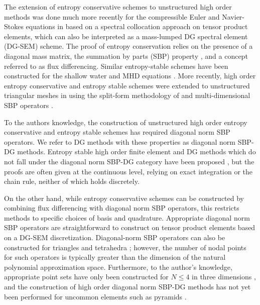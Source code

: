 \documentclass[preprint,10pt]{elsarticle}
\theoremstyle{definition}
\theoremstyle{lemma}
\theoremstyle{theorem}
\theoremstyle{assumption}
\begin{document}
The extension of entropy conservative schemes to unstructured high order methods was done much more recently for the compressible Euler and Navier-Stokes equations in \cite{fisher2013high, carpenter2014entropy} based on a spectral collocation approach on tensor product elements, which can also be interpreted as a mass-lumped DG spectral element (DG-SEM) scheme.  The proof of entropy conservation relies on the presence of a diagonal mass matrix, the summation by parts (SBP) property \cite{gassner2013skew}, and  a concept referred to as flux differencing.  Similar entropy-stable schemes have been constructed for the shallow water and MHD equations \cite{gassner2016well,  wintermeyer2017entropy, winters2017uniquely}.  More recently, high order entropy conservative and entropy stable schemes were extended to unstructured triangular meshes in \cite{chen2017entropy} using the split-form methodology of \cite{gassner2016split} and multi-dimensional SBP operators \cite{hicken2016multidimensional}.  

To the authors knowledge, the construction of unstructured high order entropy conservative and entropy stable schemes  has required diagonal norm SBP operators.  We refer to DG methods with these properties as diagonal norm SBP-DG methods.  Entropy stable high order finite element and DG methods which do not fall under the diagonal norm SBP-DG category have been proposed \cite{hughes1986new}, but the proofs are often given at the continuous level, relying on exact integration or the chain rule, neither of which holds discretely.

On the other hand, while entropy conservative schemes can be constructed by combining flux differencing with diagonal norm SBP operators, this restricts methods to specific choices of basis and quadrature.  Appropriate diagonal norm SBP operators are straightforward to construct on tensor product elements based on a DG-SEM discretization.  Diagonal-norm SBP operators can also be constructed for triangles and tetrahedra \cite{chin1999higher,  hicken2016multidimensional, chen2017entropy}; however, the number of nodal points for such operators is typically greater than the dimension of the natural polynomial approximation space.  Furthermore, to the author's knowledge, appropriate point sets have only been constructed for $N \leq 4$ in three dimensions \cite{zhebel2014comparison}, and the construction of high order diagonal norm SBP-DG methods has not yet been performed for uncommon elements such as pyramids \cite{chan2016orthogonal}.  
\end{document}
